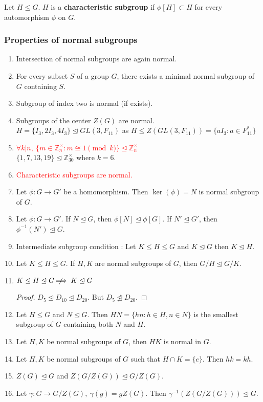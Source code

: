\begin{definition}
	Let $H \le G$. $H$ is a \textbf{characteristic subgroup} if $\phi[H] \subset H$ for every automorphism $\phi$ on $G$.
\end{definition}

\subsubsection{Properties of normal subgroups}
\begin{enumerate}
	\item Intersection of normal subgroups are again normal.
	\item For every subset $S$ of a group $G$, there exists a minimal normal subgroup of $G$ containing $S$.
	\item Subgroup of index two is normal (if exists).
	\item Subgroups of the center $Z(G)$ are normal.\\
		$H = \{ I_3,2I_3,4I_3 \} \trianglelefteq GL(3,F_{11})$ as $H \le Z(GL(3,F_{11})) = \{ aI_3 : a \in F^\ast_{11} \}$
	\item \textcolor{red}{$\forall k|n,\ \{ m \in \mathbb{Z}_n^\times : m \cong 1 \pmod{k} \} \trianglelefteq \mathbb{Z}_n^\times$}\\
		$\{ 1,7,13,19 \} \trianglelefteq \mathbb{Z}_{30}^\times$ where $k = 6$.
	\item \textcolor{red}{Characteristic subgroups are normal.}
	\item Let $\phi : G \to G'$ be a homomorphism. Then $\ker(\phi) = N$ is normal subgroup of $G$.
	\item Let $\phi : G \to G'$.  If $N \trianglelefteq G$, then $\phi[N] \trianglelefteq \phi[G]$.  If $N' \trianglelefteq G'$, then $\phi^{-1}(N') \trianglelefteq G$.
	\item Intermediate subgroup condition : Let $K \le H \le G$ and $K \trianglelefteq G$ then $K \trianglelefteq H$.
	\item Let $K \le H \le G$. If $H,K$ are normal subgroups of $G$, then $G/H \trianglelefteq G/K$.
	\item $K \trianglelefteq H \trianglelefteq G \;\not\nobreak\!\!\!\!\implies K \trianglelefteq G$
		\begin{proof}
			$D_5 \trianglelefteq D_{10} \trianglelefteq D_{20}$. But $D_5 \not\trianglelefteq D_{20}$.
		\end{proof}
	\item Let $H \le G$ and $N \trianglelefteq G$. Then $HN = \{ hn : h \in H, n \in N\}$ is the smallest subgroup of $G$ containing both $N$ and $H$.
	\item Let $H,K$ be normal subgroups of $G$, then $HK$ is normal in $G$.
	\item Let $H,K$ be normal subgroups of $G$ such that $H \cap K = \{ e \}$. Then $hk = kh$.
	\item $Z(G) \trianglelefteq G$ and $Z(G/Z(G)) \trianglelefteq G/Z(G)$.
	\item Let $\gamma : G \to G/Z(G),\ \gamma(g) = gZ(G)$. Then $\gamma^{-1}(Z(G/Z(G))) \trianglelefteq G$.
\end{enumerate}

